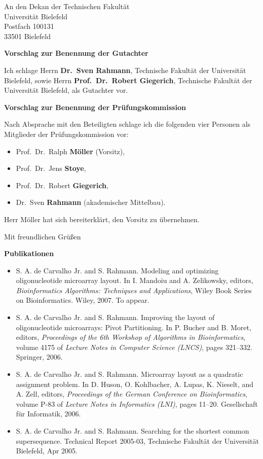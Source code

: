 \documentclass[11pt,a4paper]{letter}
\date{27. Februar 2007}
\begin{document}
\begin{letter}{
  An den Dekan der Technischen Fakult\"at\\
  Universit\"at Bielefeld\\
  Postfach 100131\\
  33501 Bielefeld
}

\opening{ {\bf Vorschlag zur Benennung der Gutachter}}

Ich schlage Herrn \textbf{Dr.\ Sven Rahmann}, Technische Fakult\"at der
Universit\"at Bielefeld, sowie Herrn \textbf{Prof.\ Dr.\ Robert Giegerich},
Technische Fakult\"at der  Universit\"at Bielefeld, als Gutachter vor.

{\bf Vorschlag zur Benennung der Pr\"ufungskommission}

Nach Absprache mit den Beteiligten schlage ich die folgenden vier Personen als
Mitglieder der Pr\"ufungskommission vor:
\begin{itemize}
  \item Prof.\ Dr.\ Ralph \textbf{M\"oller} (Vorsitz),
  \item Prof.\ Dr.\ Jens \textbf{Stoye},
  \item Prof.\ Dr.\ Robert \textbf{Giegerich},
  \item Dr.\ Sven \textbf{Rahmann} (akademischer Mittelbau).
\end{itemize}

Herr M\"oller hat sich bereiterkl\"art, den Vorsitz zu \"ubernehmen.

\closing{Mit freundlichen Gr\"u{\ss}en}


\newpage
{\bf\large Publikationen}

\begin{itemize}
\item S. A. de Carvalho Jr. and S. Rahmann. Modeling and optimizing
oligonucleotide microarray layout. In I. Mandoiu and A. Zelikowsky, editors,
\emph{Bioinformatics Algorithms: Techniques and Applications}, Wiley Book Series
on Bioinformatics. Wiley, 2007. To appear.

\item S. A. de Carvalho Jr. and S. Rahmann. Improving the layout of
oligonucleotide microarrays: Pivot Partitioning. In P. Bucher and B. Moret,
editors, \emph{Proceedings of the 6th Workshop of Algorithms in Bioinformatics},
volume 4175 of \emph{Lecture Notes in Computer Science (LNCS)}, pages 321--332.
Springer, 2006.

\item S. A. de Carvalho Jr. and S. Rahmann. Microarray layout as a quadratic
assignment problem. In D. Huson, O. Kohlbacher, A. Lupas, K. Nieselt, and A.
Zell, editors, \emph{Proceedings of the German Conference on Bioinformatics},
volume P-83 of \emph{Lecture Notes in Informatics (LNI)}, pages 11--20.
Gesellschaft f\"ur Informatik, 2006.

\item S. A. de Carvalho Jr. and S. Rahmann. Searching for the shortest common
supersequence. Technical Report 2005-03, Technische Fakult\"at der Universit\"at
Bielefeld, Apr 2005.
\end{itemize}

\end{letter}
\end{document}
